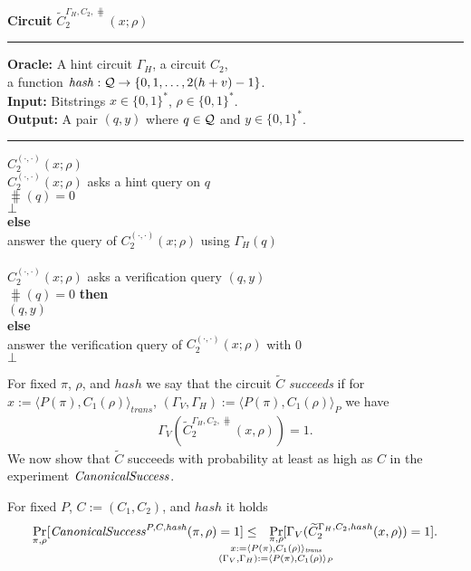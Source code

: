 \begin{codeblock}
  \textbf{Circuit} $\widetilde{C}_2^{\Gamma_H, C_2, \hash} (x; \rho)$
  \medskip \hrule
  \textbf{Oracle:} A hint circuit $\Gamma_H$, a circuit $C_2$, \\ \IndII a function $\operatorname{\mathit{hash}} : \mathcal{Q} \rightarrow \{0,1,\dots, 2(h+v)-1\}$. \\
  \textbf{Input:} Bitstrings $x \in \{0,1\}^{*}$, $\rho \in \{0,1\}^{*}$. \\
  \textbf{Output:} A pair $(q, y)$ where $q \in \mathcal{Q}$ and $y \in \{0,1\}^{*}$.
  \medskip\hrule
  \Run $C_2^{(\cdot, \cdot)}(x; \rho)$ \\
  \IndI \If $C_2^{(\cdot, \cdot)}(x; \rho)$ asks a hint query on $q$ \Then\\
  \IndII \If $\hash(q) = 0$ \Then\\
  \IndIII \Return $\bot$\\
  \IndII \textbf{else}\\
  \IndIII answer the query of $C_2^{(\cdot, \cdot)}(x; \rho)$ using $\Gamma_H(q)$\\
  \\
  \IndI \If $C_2^{(\cdot, \cdot)}(x; \rho)$ asks a verification query $(q, y)$ \Then \\
  \IndII \If $\hash(q) = 0 $ \textbf{then} \\
  \IndIII \Return $(q, y)$ \\
  \IndII \textbf{else} \\
  \IndIII answer the verification query of $C_2^{(\cdot, \cdot)}(x; \rho)$ with 0 \\
  \Return $\bot$
\end{codeblock}
%
\vspace*{\fill}
\pagebreak
For fixed $\pi$, $\rho$, and $hash$ we say that the circuit $\widetilde{C}$ \textit{succeeds} if
for $x := \langle P(\pi), C_1(\rho) \rangle_{\mathit{trans}}$, $(\Gamma_V, \Gamma_H) := \langle P(\pi), C_1(\rho) \rangle_{P}$ we have
\begin{align*}
  \Gamma_V(\widetilde{C}_2^{\Gamma_H, C_2, \hash}(x, \rho)) = 1.
\end{align*}
We now show that $\widetilde{C}$ succeeds with probability at least as high as $C$ in the experiment $\operatorname{\mathit{CanonicalSuccess}}$.
%
\begin{lemma}
  \label{lemma:ctilda_c}
  For fixed $P$, $C := (C_1, C_2)$, and $hash$ it holds
  \begin{align*}
    \underset{\pi, \rho}{\Pr}[\CanonicalSuccess^{P, C, \hash}(\pi, \rho) = 1]
    \leq
    \mkern13mu
    \underset{
      \mathclap{
      \substack{
        \pi, \rho \\
        x := \langle P(\pi), C_1(\rho) \rangle_{\mathit{trans}} \\
        (\Gamma_V, \Gamma_H) := \langle P(\pi), C_1(\rho) \rangle_{P}}}}
  {\Pr}[\Gamma_V(\widetilde{C}_2^{\Gamma_H, C_2, hash}(x, \rho)) = 1].
  \end{align*}
\end{lemma}
